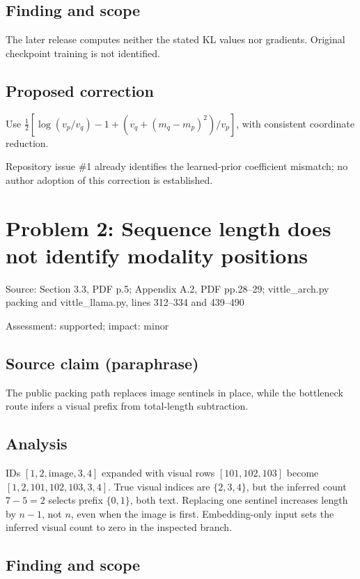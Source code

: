 \documentclass[11pt]{article}
\begin{document}
\subsection*{Finding and scope}

The later release computes neither the stated KL values nor gradients. Original checkpoint training is not identified.

\subsection*{Proposed correction}

Use \(\tfrac12[\log(v_p/v_q)-1+(v_q+(m_q-m_p)^2)/v_p]\), with consistent coordinate reduction.

Repository issue \#1 already identifies the learned-prior coefficient mismatch; no author adoption of this correction is established.

\section*{Problem 2: Sequence length does not identify modality positions}

Source: Section 3.3, PDF p.5; Appendix A.2, PDF pp.28–29; vittle\_arch.py packing and vittle\_llama.py, lines 312–334 and 439–490

Assessment: supported; impact: minor

\subsection*{Source claim (paraphrase)}

The public packing path replaces image sentinels in place, while the bottleneck route infers a visual prefix from total-length subtraction.

\subsection*{Analysis}

IDs \([1,2,\mathrm{image},3,4]\) expanded with visual rows \([101,102,103]\) become \([1,2,101,102,103,3,4]\). True visual indices are \(\{2,3,4\}\), but the inferred count \(7-5=2\) selects prefix \(\{0,1\}\), both text. Replacing one sentinel increases length by \(n-1\), not \(n\), even when the image is first. Embedding-only input sets the inferred visual count to zero in the inspected branch.

\subsection*{Finding and scope}
\end{document}
